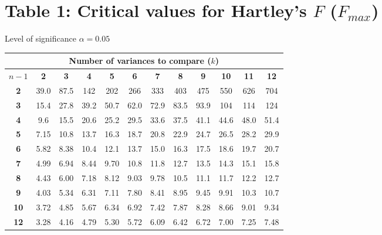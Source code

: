 \section{Table 1: Critical values for Hartley’s $F$ ($F_{max}$)}
\label{table1}

Level of significance $\alpha = 0.05$ \\
\begin{center}
\small
\begin{tabular}{c|c|c|c|c|c|c|c|c|c|c|c}
\hline
\multicolumn{12}{c}{\textbf{Number of variances to compare} ($k$)}                    \bstrut\tstrut\\
\hline
$n - 1$ & \multicolumn{1}{c}{\textbf{2}}    & \multicolumn{1}{c}{\textbf{3}}    & \multicolumn{1}{c}{\textbf{4}}    & \multicolumn{1}{c}{\textbf{5}}    & \multicolumn{1}{c}{\textbf{6}}    & \multicolumn{1}{c}{\textbf{7}}    & \multicolumn{1}{c}{\textbf{8}}    & \multicolumn{1}{c}{\textbf{9}}    & \multicolumn{1}{c}{\textbf{10}}   & \multicolumn{1}{c}{\textbf{11}}   & \multicolumn{1}{c}{\textbf{12}} \bstrut\tstrut\\
\hline
\textbf{2}     & 39.0 & 87.5 & 142  & 202  & 266  & 333  & 403  & 475  & 550  & 626  & 704  \bstrut\tstrut\\
\textbf{3}     & 15.4 & 27.8 & 39.2 & 50.7 & 62.0 & 72.9 & 83.5 & 93.9 & 104  & 114  & 124  \bstrut\tstrut\\
\textbf{4}     & 9.6  & 15.5 & 20.6 & 25.2 & 29.5 & 33.6 & 37.5 & 41.1 & 44.6 & 48.0 & 51.4 \bstrut\tstrut\\
\textbf{5}     & 7.15 & 10.8 & 13.7 & 16.3 & 18.7 & 20.8 & 22.9 & 24.7 & 26.5 & 28.2 & 29.9 \bstrut\tstrut\\
\textbf{6}     & 5.82 & 8.38 & 10.4 & 12.1 & 13.7 & 15.0 & 16.3 & 17.5 & 18.6 & 19.7 & 20.7 \bstrut\tstrut\\
\textbf{7}     & 4.99 & 6.94 & 8.44 & 9.70 & 10.8 & 11.8 & 12.7 & 13.5 & 14.3 & 15.1 & 15.8 \bstrut\tstrut\\
\textbf{8}     & 4.43 & 6.00 & 7.18 & 8.12 & 9.03 & 9.78 & 10.5 & 11.1 & 11.7 & 12.2 & 12.7 \bstrut\tstrut\\
\textbf{9}     & 4.03 & 5.34 & 6.31 & 7.11 & 7.80 & 8.41 & 8.95 & 9.45 & 9.91 & 10.3 & 10.7 \bstrut\tstrut\\
\textbf{10}    & 3.72 & 4.85 & 5.67 & 6.34 & 6.92 & 7.42 & 7.87 & 8.28 & 8.66 & 9.01 & 9.34 \bstrut\tstrut\\
\textbf{12}    & 3.28 & 4.16 & 4.79 & 5.30 & 5.72 & 6.09 & 6.42 & 6.72 & 7.00 & 7.25 & 7.48 \bstrut\tstrut\\

\end{tabular}
\end{center}
